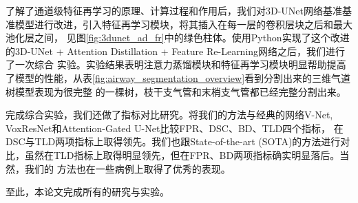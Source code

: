 了解了通道级特征再学习的原理、计算过程和作用后，我们对3D-UNet网络基准基准模型进行改进，引入特征再学习模块，将其插入在每一层的卷积层块之后和最大池化层之间，
见图\ref{fig:3dunet_ad_fr}中的绿色柱体。使用Python实现了这个改进的3D-UNet + Attention Distillation + Feature Re-Learning网络之后，我们进行了一次综合
实验。实验结果表明注意力蒸馏模块和特征再学习模块明显帮助提高了模型的性能，从表\ref{fig:airway_segmentation_overview}看到分割出来的三维气道树模型表现为很完整
的一棵树，枝干支气管和末梢支气管都已经完整分割出来。

完成综合实验，我们还做了指标对比研究。将我们的方法与经典的网络V-Net, VoxResNet和Attention-Gated U-Net比较FPR、DSC、BD、TLD四个指标，
在DSC与TLD两项指标上取得领先。我们也跟State-of-the-art (SOTA)的方法进行对比，虽然在TLD指标上取得明显领先，但在FPR、BD两项指标确实明显落后。当然，我们的
方法也在一些病例上取得了优秀的表现。

至此，本论文完成所有的研究与实验。